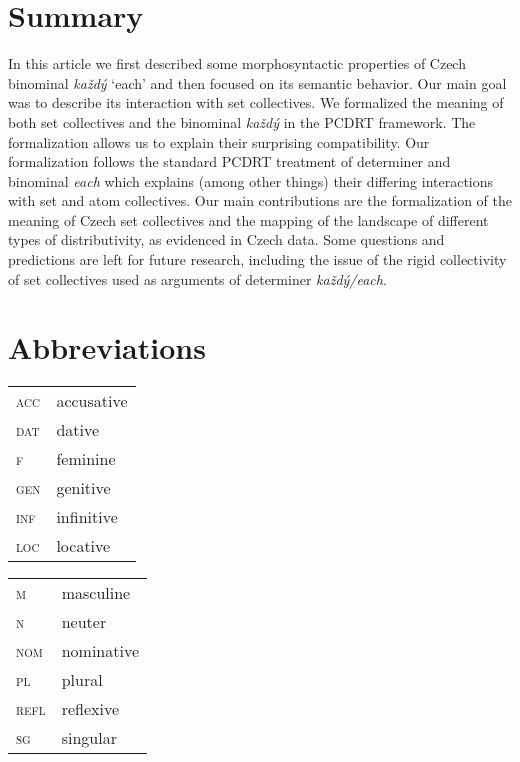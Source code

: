\documentclass[output=paper,colorlinks,citecolor=brown,newtxmath]{langscibook}
\begin{document}
\section{Summary}\label{summary}

In this article we first described some morphosyntactic properties of Czech binominal \textit{každý} `each' and then focused on its semantic behavior. Our main goal was to describe its interaction with set collectives. We formalized the meaning of both set collectives and the binominal \textit{každý} in the PCDRT framework. The formalization allows us to explain their surprising compatibility. Our formalization follows the standard PCDRT treatment of determiner and binominal \textit{each} which explains (among other things) their differing interactions with set and atom collectives. Our main contributions are the formalization of the meaning of Czech set collectives and the mapping of the landscape of different types of distributivity, as evidenced in Czech data. Some questions and predictions are left for future research, including the issue of the rigid collectivity of set collectives used as arguments of determiner \textit{každý/each}.


\section*{Abbreviations}

\begin{tabularx}{.5\textwidth}{@{}lX@{}}
\textsc{acc}&accusative\\
\textsc{dat}&dative\\
\textsc{f}&feminine\\
\textsc{gen}&genitive\\
\textsc{inf}&infinitive\\
\textsc{loc}&locative\\
\end{tabularx}%
\begin{tabularx}{.5\textwidth}{@{}lX@{}}
\textsc{m}&masculine\\
\textsc{n}&neuter\\
\textsc{nom}&{nominative}\\
\textsc{pl}&{plural}\\
\textsc{refl}&reflexive\\
\textsc{sg}&singular\\
\end{tabularx}
\end{document}
